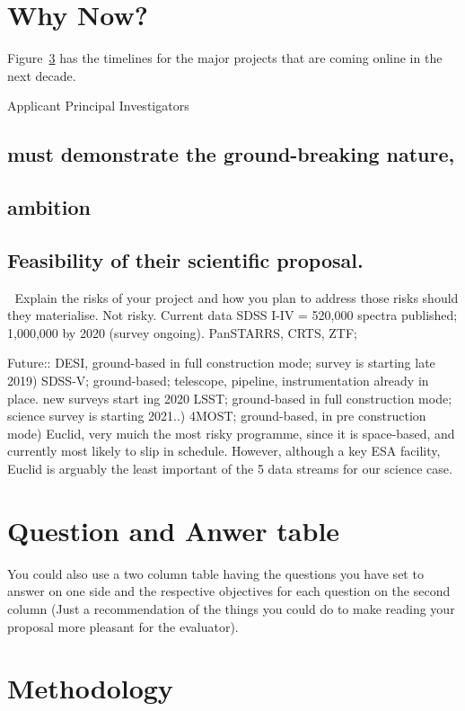 \documentclass[oneside, a4paper, onecolumn, 11pt]{article}
\begin{document}
\section{Why Now?}
Figure~\ref{} has the timelines for the major projects that are coming online in the next decade. 


Applicant Principal Investigators 
\subsection{must demonstrate the ground-breaking nature, }
\subsection{ ambition}

\subsection{Feasibility of their scientific proposal.}
 Explain the risks of your project and how you plan to address those risks should they materialise.
Not risky. 
Current data SDSS I-IV = 520,000 spectra published; 1,000,000 by 2020 (survey ongoing). 
PanSTARRS, CRTS, ZTF;

Future::
DESI, ground-based in full construction mode; survey is starting late 2019)
SDSS-V; ground-based; telescope, pipeline, instrumentation already in place. new surveys start ing 2020
LSST; ground-based in full construction mode; science survey is starting 2021..)
4MOST; ground-based, in pre construction mode)
Euclid, very muich the most risky programme, since it is space-based, and currently most likely to slip in schedule. However, although a key ESA facility, Euclid is arguably the least important of the 5 data streams for our science case. 

\section{Question and Anwer table}
You could also use a two column table having the questions you have set to answer on one side and the respective objectives for each question on the second column (Just a recommendation of the things you could do to make reading your proposal more pleasant for the evaluator).



\newpage
\section{Methodology}
\end{document}
